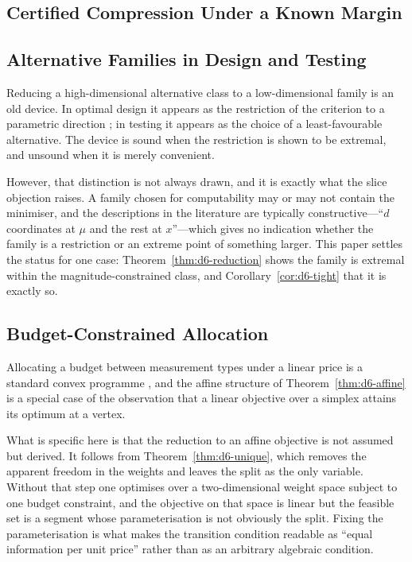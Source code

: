 \subsection{Certified Compression Under a Known Margin}

\subsection{Alternative Families in Design and Testing}

Reducing a high-dimensional alternative class to a low-dimensional family is an old device.
In optimal design it appears as the restriction of the criterion to a parametric direction
\cite{pukelsheim2006,fedorov1972}; in testing it appears as the choice of a least-favourable
alternative. The device is sound when the restriction is shown to be extremal, and unsound
when it is merely convenient.

However, that distinction is not always drawn, and it is exactly what the slice objection
raises. A family chosen for computability may or may not contain the minimiser, and the
descriptions in the literature are typically constructive---``$d$ coordinates at $\mu$ and
the rest at $x$''---which gives no indication whether the family is a restriction or an
extreme point of something larger. This paper settles the status for one case:
Theorem~\ref{thm:d6-reduction} shows the family is extremal within the magnitude-constrained
class, and Corollary~\ref{cor:d6-tight} that it is exactly so.

\subsection{Budget-Constrained Allocation}

Allocating a budget between measurement types under a linear price is a standard convex
programme \cite{boyd2004}, and the affine structure of Theorem~\ref{thm:d6-affine} is a special
case of the observation that a linear objective over a simplex attains its optimum at a
vertex.

What is specific here is that the reduction to an affine objective is not assumed but
derived. It follows from Theorem~\ref{thm:d6-unique}, which removes the apparent freedom in the
weights and leaves the split as the only variable. Without that step one optimises over a
two-dimensional weight space subject to one budget constraint, and the objective on that
space is linear but the feasible set is a segment whose parameterisation is not obviously the
split. Fixing the parameterisation is what makes the transition condition readable as ``equal
information per unit price'' rather than as an arbitrary algebraic condition.

